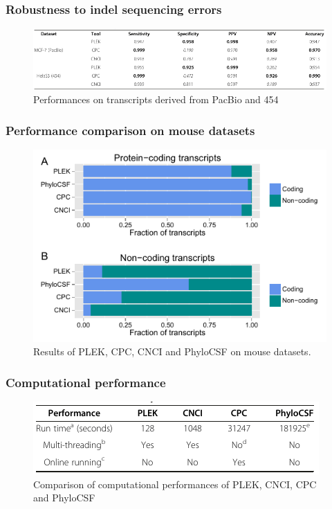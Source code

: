 \documentclass[hyperref={pdfpagelabels=false}]{beamer}
\begin{document}
\begin{frame}
\frametitle{Robustness to indel sequencing errors}
\begin{figure}
	\centering
	\includegraphics[scale=0.4]{fig3}
	\caption{Performances on transcripts derived from PacBio and 454}
	\label{fig:fig3}
\end{figure}
\end{frame}

\begin{frame}
\frametitle{Performance comparison on mouse datasets}
\begin{figure}
	\centering
	\includegraphics[scale=0.5]{fig4}
	\caption{Results of PLEK, CPC, CNCI and PhyloCSF on mouse datasets.}
	\label{fig:fig4}
\end{figure}
\end{frame}

\begin{frame}
\frametitle{Computational performance}
\begin{figure}
	\centering
	\includegraphics[scale=0.5]{fig5}
	\caption{Comparison of computational performances of PLEK, CNCI, CPC and PhyloCSF}
	\label{fig:fig5}
\end{figure}
\end{frame}
\end{document}
